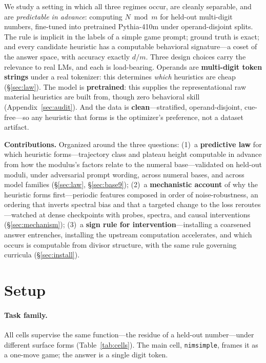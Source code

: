 \documentclass{article} %
\begin{document}
We study a setting in which all three regimes occur, are cleanly separable, and are \emph{predictable in advance}: computing $N \bmod m$ for held-out multi-digit numbers, fine-tuned into pretrained Pythia-410m under operand-disjoint splits. The rule is implicit in the labels of a simple game prompt; ground truth is exact; and every candidate heuristic has a computable behavioral signature---a coset of the answer space, with accuracy exactly $d/m$. Three design choices carry the relevance to real LMs, and each is load-bearing. Operands are \textbf{multi-digit token strings} under a real tokenizer: this determines \emph{which} heuristics are cheap (\S\ref{sec:law}). The model is \textbf{pretrained}: this supplies the representational raw material heuristics are built from, though zero behavioral skill (Appendix~\ref{sec:audit}). And the data is \textbf{clean}---stratified, operand-disjoint, cue-free---so any heuristic that forms is the optimizer's preference, not a dataset artifact.

\textbf{Contributions.} Organized around the three questions: (1)~a \textbf{predictive law} for which heuristic forms---trajectory class and plateau height computable in advance from how the modulus's factors relate to the numeral base---validated on held-out moduli, under adversarial prompt wording, across numeral bases, and across model families (\S\ref{sec:law}, \S\ref{sec:base9}); (2)~a \textbf{mechanistic account} of why the heuristic forms first---periodic features composed in order of noise-robustness, an ordering that inverts spectral bias and that a targeted change to the loss reroutes---watched at dense checkpoints with probes, spectra, and causal interventions (\S\ref{sec:mechanism}); (3)~a \textbf{sign rule for intervention}---installing a coarsened answer entrenches, installing the upstream computation accelerates, and which occurs is computable from divisor structure, with the same rule governing curricula (\S\ref{sec:install}).

\section{Setup}
\label{sec:setup}

\paragraph{Task family.} All cells supervise the same function---the residue of a held-out number---under different surface forms (Table~\ref{tab:cells}). The main cell, \texttt{nimsimple}, frames it as a one-move game; the answer is a single digit token.
\end{document}

